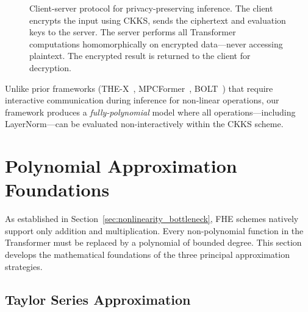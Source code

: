 \begin{figure}[htbp]
\caption{Client-server protocol for privacy-preserving inference. The client encrypts the input using CKKS, sends the ciphertext and evaluation keys to the server. The server performs all Transformer computations homomorphically on encrypted data---never accessing plaintext. The encrypted result is returned to the client for decryption.}
\label{fig:client_server}
\end{figure}

Unlike prior frameworks (THE-X~\cite{chen2022thex}, MPCFormer~\cite{li2023mpcformer}, BOLT~\cite{pang2024bolt}) that require interactive communication during inference for non-linear operations, our framework produces a \emph{fully-polynomial} model where all operations---including LayerNorm---can be evaluated non-interactively within the CKKS scheme.


\section{Polynomial Approximation Foundations}
\label{sec:poly_approx}

As established in Section~\ref{sec:nonlinearity_bottleneck}, FHE schemes natively support only addition and multiplication. Every non-polynomial function in the Transformer must be replaced by a polynomial of bounded degree. This section develops the mathematical foundations of the three principal approximation strategies.

\subsection{Taylor Series Approximation}

